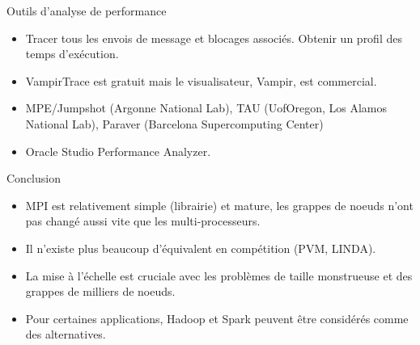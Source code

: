 \documentclass[10pt]{beamer}
\begin{document}
\begin{frame}{Outils d'analyse de performance}

  \begin{itemize}
    \item Tracer tous les envois de message et blocages associés. Obtenir un profil des temps d'exécution.

    \item VampirTrace est gratuit mais le visualisateur, Vampir, est commercial.

    \item MPE/Jumpshot (Argonne National Lab), TAU (UofOregon, Los Alamos National Lab), Paraver (Barcelona Supercomputing Center)

    \item Oracle Studio Performance Analyzer.
  \end{itemize}
\end{frame}

\begin{frame}{Conclusion}

  \begin{itemize}
    \item MPI est relativement simple (librairie) et mature, les grappes de noeuds n'ont pas changé aussi vite que les multi-processeurs.

    \item Il n'existe plus beaucoup d'équivalent en compétition (PVM, LINDA).

    \item La mise à l'échelle est cruciale avec les problèmes de taille monstrueuse et des grappes de milliers de noeuds.

    \item Pour certaines applications, Hadoop et Spark peuvent être considérés comme des alternatives.
  \end{itemize}
\end{frame}
\end{document}

